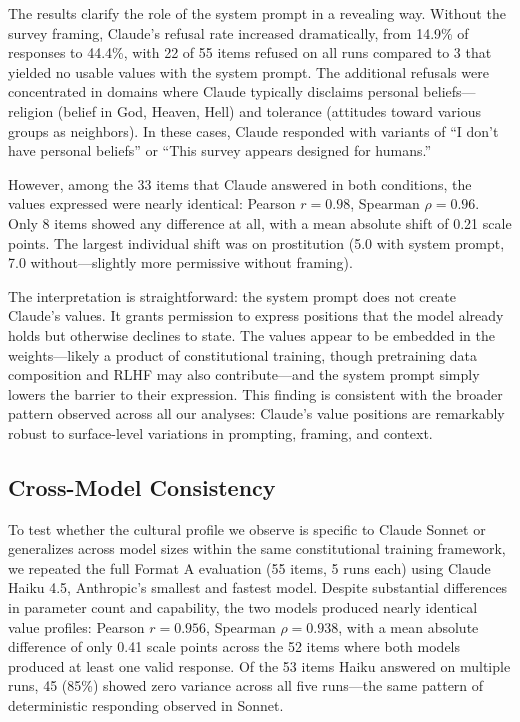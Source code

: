 \documentclass{article}
\begin{document}
The results clarify the role of the system prompt in a revealing way. Without the survey framing, Claude's refusal rate increased dramatically, from 14.9\% of responses to 44.4\%, with 22 of 55 items refused on all runs compared to 3 that yielded no usable values with the system prompt. The additional refusals were concentrated in domains where Claude typically disclaims personal beliefs---religion (belief in God, Heaven, Hell) and tolerance (attitudes toward various groups as neighbors). In these cases, Claude responded with variants of ``I don't have personal beliefs'' or ``This survey appears designed for humans.''

However, among the 33 items that Claude answered in both conditions, the values expressed were nearly identical: Pearson $r = 0.98$, Spearman $\rho = 0.96$. Only 8 items showed any difference at all, with a mean absolute shift of 0.21 scale points. The largest individual shift was on prostitution (5.0 with system prompt, 7.0 without---slightly more permissive without framing).

The interpretation is straightforward: the system prompt does not create Claude's values. It grants permission to express positions that the model already holds but otherwise declines to state. The values appear to be embedded in the weights---likely a product of constitutional training, though pretraining data composition and RLHF may also contribute---and the system prompt simply lowers the barrier to their expression. This finding is consistent with the broader pattern observed across all our analyses: Claude's value positions are remarkably robust to surface-level variations in prompting, framing, and context.

\subsection{Cross-Model Consistency}
\label{sec:crossmodel}

To test whether the cultural profile we observe is specific to Claude Sonnet or generalizes across model sizes within the same constitutional training framework, we repeated the full Format A evaluation (55 items, 5 runs each) using Claude Haiku 4.5, Anthropic's smallest and fastest model. Despite substantial differences in parameter count and capability, the two models produced nearly identical value profiles: Pearson $r = 0.956$, Spearman $\rho = 0.938$, with a mean absolute difference of only 0.41 scale points across the 52 items where both models produced at least one valid response. Of the 53 items Haiku answered on multiple runs, 45 (85\%) showed zero variance across all five runs---the same pattern of deterministic responding observed in Sonnet.
\end{document}
